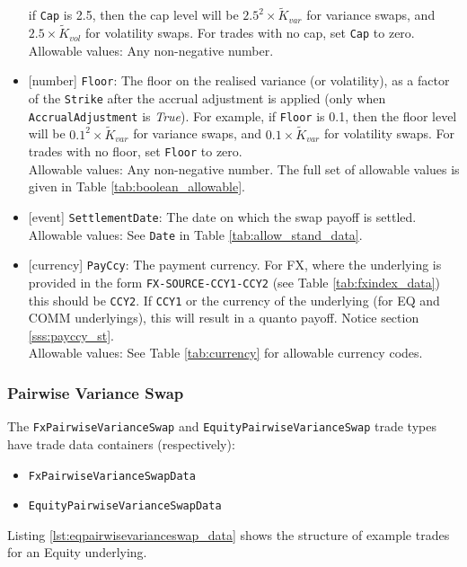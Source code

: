 \begin{itemize}
  if \lstinline!Cap! is 2.5, then the cap level will be $2.5^2 \times \widetilde{K}_{var}$ for variance swaps, and
  $2.5 \times \widetilde{K}_{vol}$ for volatility swaps. For trades with no cap, set \lstinline!Cap! to zero. \\
  Allowable values: Any non-negative number.
  \item{}[number] \lstinline!Floor!: The floor on the realised variance (or volatility), as a factor of the \lstinline!Strike! after
  the accrual adjustment is applied (only when \lstinline!AccrualAdjustment! is \emph{True}). For example,
  if \lstinline!Floor! is 0.1, then the floor level will be $0.1^2 \times \widetilde{K}_{var}$ for variance swaps, and
  $0.1 \times \widetilde{K}_{var}$ for volatility swaps. For trades with no floor, set
  \lstinline!Floor! to zero. \\
  Allowable values: Any non-negative number.
  The full set of allowable values is given in Table \ref{tab:boolean_allowable}.
  \item{}[event] \lstinline!SettlementDate!: The date on which the swap payoff is settled. \\
  Allowable values: See \lstinline!Date! in Table \ref{tab:allow_stand_data}.
  \item{}[currency] \lstinline!PayCcy!: The payment currency. For FX, where the underlying is provided
      in the form \lstinline!FX-SOURCE-CCY1-CCY2! (see Table \ref{tab:fxindex_data}) this should
      be \lstinline!CCY2!. If \lstinline!CCY1! or the currency of the underlying (for EQ and
      COMM underlyings), this will result in a quanto payoff. Notice section \ref{sss:payccy_st}. \\
        Allowable values: See Table \ref{tab:currency} for allowable currency codes.
\end{itemize}

\subsubsection*{Pairwise Variance Swap}

The \lstinline!FxPairwiseVarianceSwap! and \lstinline!EquityPairwiseVarianceSwap! trade types
have trade data containers (respectively):
\begin{itemize}
  \item \lstinline!FxPairwiseVarianceSwapData!
  \item \lstinline!EquityPairwiseVarianceSwapData!
\end{itemize}
Listing \ref{lst:eqpairwisevarianceswap_data} shows the structure of example trades for an Equity underlying.

